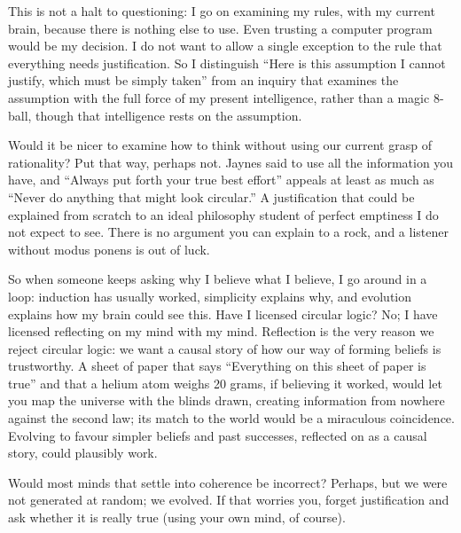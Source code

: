 This is not a halt to questioning: I go on examining my rules, with my current brain, because there is nothing else to use. Even trusting a computer program would be my decision. I do not want to allow a single exception to the rule that everything needs justification. So I distinguish ``Here is this assumption I cannot justify, which must be simply taken'' from an inquiry that examines the assumption with the full force of my present intelligence, rather than a magic 8-ball, though that intelligence rests on the assumption.

Would it be nicer to examine how to think without using our current grasp of rationality? Put that way, perhaps not. Jaynes said to use all the information you have, and ``Always put forth your true best effort'' appeals at least as much as ``Never do anything that might look circular.'' A justification that could be explained from scratch to an ideal philosophy student of perfect emptiness I do not expect to see. There is no argument you can explain to a rock, and a listener without modus ponens is out of luck.

So when someone keeps asking why I believe what I believe, I go around in a loop: induction has usually worked, simplicity explains why, and evolution explains how my brain could see this. Have I licensed circular logic? No; I have licensed reflecting on my mind with my mind. Reflection is the very reason we reject circular logic: we want a causal story of how our way of forming beliefs is trustworthy. A sheet of paper that says ``Everything on this sheet of paper is true'' and that a helium atom weighs 20 grams, if believing it worked, would let you map the universe with the blinds drawn, creating information from nowhere against the second law; its match to the world would be a miraculous coincidence. Evolving to favour simpler beliefs and past successes, reflected on as a causal story, could plausibly work. 

Would most minds that settle into coherence be incorrect? Perhaps, but we were not generated at random; we evolved. If that worries you, forget justification and ask whether it is really true (using your own mind, of course).

